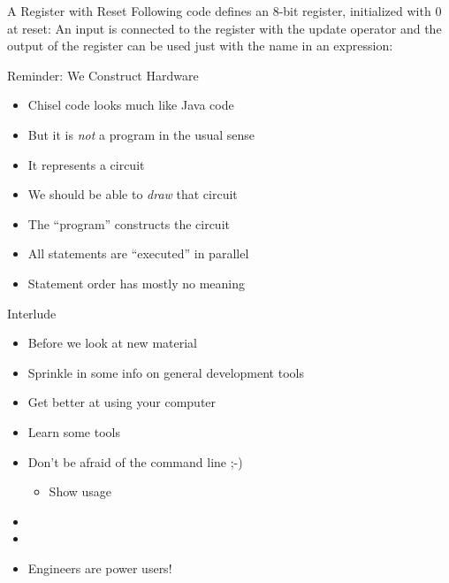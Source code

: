 \begin{frame}[fragile]{A Register with Reset}
Following code defines an 8-bit register, initialized with 0 at reset:
\noindent An input is connected to the register with the \code{:=} update operator and
the output of the register can be used just with the name in an expression:
\end{frame}

\begin{frame}[fragile]{Reminder: We Construct Hardware}
\begin{itemize}
\item Chisel code looks much like Java code
\item But it is \emph{not} a program in the usual sense
\item It represents a circuit
\item We should be able to \emph{draw} that circuit
\item The ``program'' constructs the circuit
\item All statements are ``executed'' in parallel
\item Statement order has mostly no meaning
\end{itemize}
\end{frame}

\begin{frame}[fragile]{Interlude}
\begin{itemize}
\item Before we look at new material
\item Sprinkle in some info on general development tools
\item Get better at using your computer
\item Learn some tools
\item Don't be afraid of the command line ;-)
\begin{itemize}
\item Show  usage
\end{itemize}
\item
\item
\item Engineers are power users!
\end{itemize}
\end{frame}

